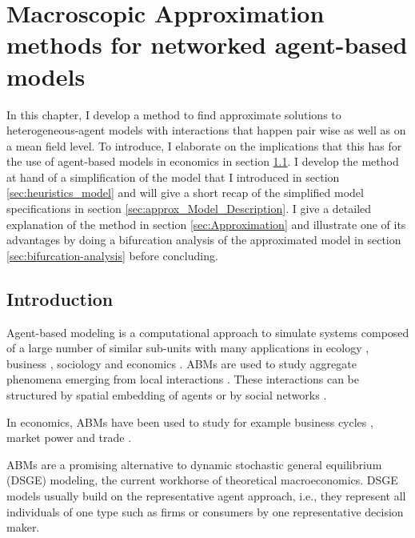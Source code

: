 \chapter{Macroscopic Approximation methods for networked agent-based models}
\label{chapter:approximation}
In this chapter, I develop a method to find approximate solutions to heterogeneous-agent models with interactions that happen pair wise as well as on a mean field level. To introduce, I elaborate on the implications that this has for the use of agent-based models in economics in section \ref{sec:approx_intro}. I develop the method at hand of a simplification of the model that I introduced in section \ref{sec:heuristics_model} and will give a short recap of the simplified model specifications in section \ref{sec:approx_Model_Description}. I give a detailed explanation of the method in section \ref{sec:Approximation} and illustrate one of its advantages by doing a bifurcation analysis of the approximated model in section \ref{sec:bifurcation-analysis} before concluding. 
\section{Introduction}
\label{sec:approx_intro}

Agent-based modeling is a computational approach to simulate systems composed of a large number of similar sub-units with many applications in ecology \citep{Grimm2005}, business \citep{Bonabeau2002}, sociology \citep{Macy2002} and economics \citep{Tesfatsion2006, Hamill2015}.
ABMs are used to study aggregate phenomena emerging from local interactions \citep{Epstein1999}.
These interactions can be structured by spatial embedding of agents or by social networks \citep{Gross2008,Holme2006a,Bargigli2014}.

In economics, ABMs have been used to study for example business cycles \citep{DelliGatti2008}, market power \citep{Tesfatsion2006} and trade \citep{Hamill2015}.

ABMs are a promising alternative to dynamic stochastic general equilibrium (DSGE) modeling, the current workhorse of theoretical macroeconomics. 
DSGE models usually build on the representative agent approach, i.e., they represent all individuals of one type such as firms or consumers by one representative decision maker.

